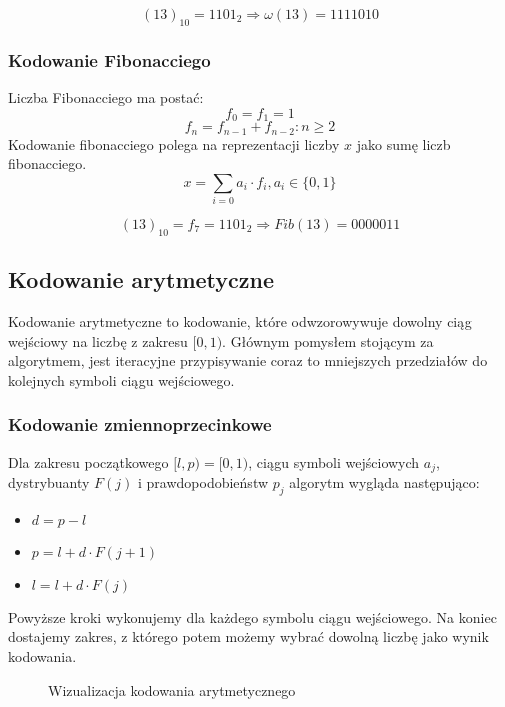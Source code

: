 \documentclass{../notatki}
\begin{document}
$$
(13)_{10} = 1101_2 \Rightarrow \omega(13) = 11 1101 0
$$

\subsubsection{Kodowanie Fibonacciego}

Liczba Fibonacciego ma postać:
$$
f_0=f_1=1
$$
$$
f_n = f_{n-1} + f_{n-2}: n \geq 2
$$
Kodowanie fibonacciego polega na reprezentacji liczby $x$ jako sumę liczb
fibonacciego.
$$
x = \sum_{i=0} a_i \cdot f_i, a_i \in \{0,1\}
$$

$$
(13)_{10} = f_7 = 1101_2 \Rightarrow Fib(13) = 0000011
$$

\subsection{Kodowanie arytmetyczne}

Kodowanie arytmetyczne to kodowanie, które odwzorowywuje dowolny
ciąg wejściowy
na liczbę z zakresu $[0, 1)$. Głównym pomysłem stojącym za algorytmem, jest
iteracyjne przypisywanie coraz to mniejszych przedziałów do kolejnych symboli
ciągu wejściowego.

\subsubsection{Kodowanie zmiennoprzecinkowe}

Dla zakresu początkowego $[l, p)=[0, 1)$, ciągu symboli wejściowych $a_j$,
dystrybuanty $F(j)$ i prawdopodobieństw $p_j$ algorytm wygląda następująco:
\begin{itemize}
  \item $d = p - l$
  \item $p = l + d \cdot F(j + 1)$
  \item $l = l + d \cdot F(j)$
\end{itemize}
Powyższe kroki wykonujemy dla każdego symbolu ciągu wejściowego. Na koniec
dostajemy zakres, z którego potem możemy wybrać dowolną liczbę jako wynik
kodowania.

\begin{figure}[h]
  \centering
  \caption{Wizualizacja kodowania arytmetycznego}
\end{figure}
\end{document}

